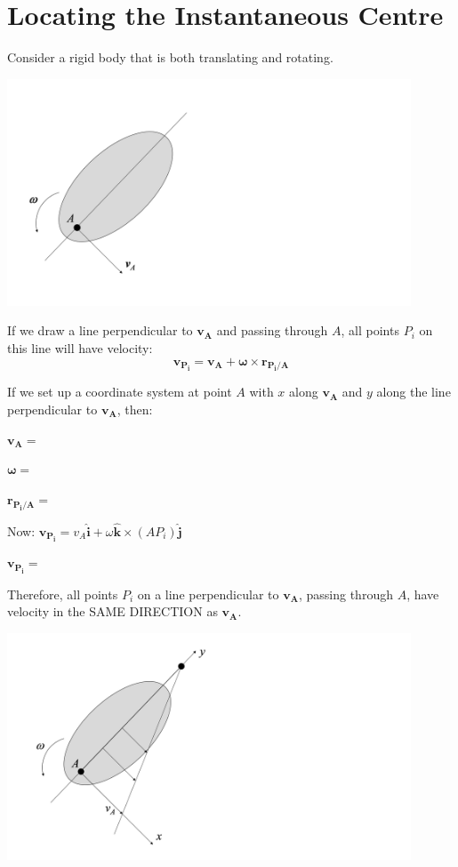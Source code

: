 \documentclass[12pt,letterpaper,twoside]{report}
\begin{document}
\section{Locating the Instantaneous Centre}
Consider a rigid body that is both translating and rotating.  

\includegraphics[trim={0cm 2cm 0cm 4cm},clip,width=0.9\textwidth, center]{Slide17}

If we draw a line perpendicular to $\bm{v_A}$ and passing through $A$, all points $P_i$ on this line will have velocity:
\[\bm{v_{P_i}} = \bm{v_A} + \bm{\omega} \times \bm{r_{P_{i}/A}}\]

If we set up a coordinate system at point $A$ with $x$ along $\bm{v_A}$ and $y$ along the line perpendicular to $\bm{v_A}$, then:

\-\hspace{1cm} $\bm{v_A} = $

\-\hspace{1cm} $\bm{\omega} = $

\-\hspace{1cm} $\bm{r_{P_{i}/A}} = $

\newpage
Now: $\bm{v_{P_i}} = v_A \bm{\hat{i}} + \omega \bm{\hat{k}} \times (A P_i) \bm{\hat{j}}$

\-\hspace{1cm} $\bm{v_{P_i}} =$

\vspace*{2\baselineskip}

Therefore, all points $P_i$ on a line perpendicular to $\bm{v_A}$, passing through $A$, have velocity in the SAME DIRECTION as $\bm{v_A}$.  

\vspace*{2\baselineskip}

\includegraphics[trim={0cm 0cm 0cm 0cm},clip,width=0.9\textwidth, center]{Slide18}
\end{document}
